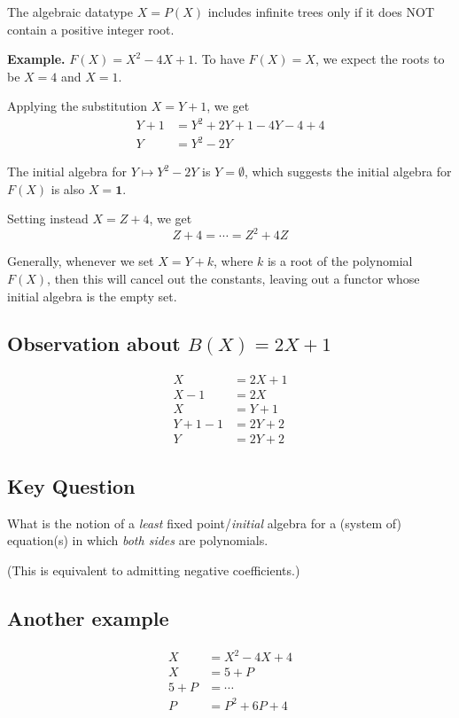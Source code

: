 \documentclass[letterpaper,numbers=enddot]{scrartcl}
\newcommand{\bone}{\boldsymbol{1}}
\begin{document}
The algebraic datatype $X = P(X)$ includes infinite trees only if it does NOT contain
a positive integer root.

\textbf{Example.}
$F(X) = X^2-4X+1$.  To have $F(X)=X$, we expect the roots to be $X = 4$ and $X = 1$.

Applying the substitution $X = Y+1$, we get
\begin{align*}
  Y+1
  &= Y^2 + 2Y + 1 - 4Y-4 + 4\\
  Y &= Y^2-2Y
\end{align*}

The initial algebra for $Y \mapsto Y^2-2Y$ is $Y=\emptyset$,
which suggests the initial algebra for $F(X)$ is also $X = \bone$.

Setting instead $X = Z + 4$, we get
\[ Z+4 = \cdots = Z^2 + 4Z \]

Generally, whenever we set $X = Y + k$,
where $k$ is a root of the polynomial $F(X)$, then this will cancel out the constants,
leaving out a functor whose initial algebra is the empty set.

\subsection{Observation about $B(X) = 2X+1$}

\begin{align*}
  X &= 2X + 1\\
  X - 1 &= 2X\\
  X &= Y+1\\
  Y+1-1 &= 2Y + 2\\
  Y &= 2Y + 2
\end{align*}

\subsection{Key Question}

What is the notion of a \emph{least} fixed point/\emph{initial} algebra for
a (system of) equation(s) in which \emph{both sides} are polynomials.

(This is equivalent to admitting negative coefficients.)

\subsection{Another example}
\begin{align*}
  X &= X^2 - 4X + 4\\
  X &= 5 + P\\
  5+P &= \cdots \\
  P &= P^2 + 6P + 4
\end{align*}
\end{document}
